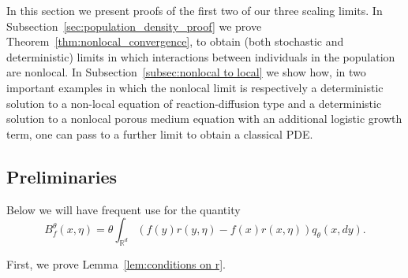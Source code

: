 \documentclass[EJP]{ejpecp} %
\newcommand{\IR}{\mathbb R}
\begin{document}
In this section we present proofs of the first two of our
three scaling limits.
In Subsection~\ref{sec:population_density_proof} 
we prove Theorem~\ref{thm:nonlocal_convergence}, to obtain (both
stochastic and deterministic) limits in
which interactions between individuals in the population are nonlocal.
In Subsection~\ref{subsec:nonlocal to local}
we show how, in two important examples in which the nonlocal
limit is respectively a deterministic solution to a non-local equation of 
reaction-diffusion type and a deterministic solution to a nonlocal 
porous medium equation with an additional logistic growth term, 
one can pass to a further 
limit to obtain a classical PDE.


\subsection{Preliminaries}
\label{sec:preliminary_proofs}

Below we will have frequent use for the quantity
\begin{equation}
\label{generator Bf}
    B^\theta_f(x, \eta) = \theta \int_{\IR^d} (f(y) r(y, \eta) - f(x) r(x, \eta)) q_\theta(x, dy) .
\end{equation}

First, we prove Lemma~\ref{lem:conditions on r}.
\end{document}
